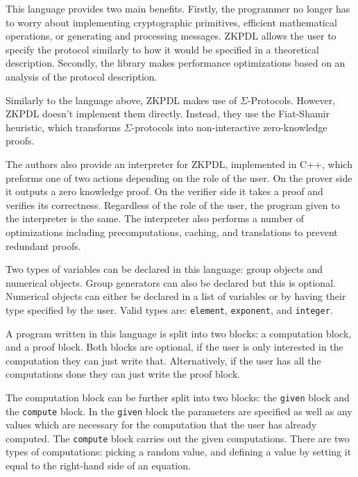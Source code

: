 \documentclass{sig-alternate}
\begin{document}
		This language provides two main benefits. Firstly, the programmer no longer 
		has to worry about implementing cryptographic primitives, efficient mathematical
		operations, or generating and processing messages. ZKPDL allows the user to
		specify the protocol similarly to how it would be specified in a theoretical
		description. Secondly, the library makes performance optimizations based on an
		analysis of the protocol description. 
		
		Similarly to the language above, ZKPDL makes use of $\Sigma$-Protocols.
		However, ZKPDL doesn't implement them directly. Instead, they use the 
		Fiat-Shamir heuristic, which transforms $\Sigma$-protocols into non-interactive
		zero-knowledge proofs.
		
		The authors also provide an interpreter for ZKPDL, implemented in C++, which
		preforms one of two actions depending on the role of the user. On the prover
		side it outputs a zero knowledge proof. On the verifier side it takes a proof
		and verifies its correctness. Regardless of the role of the user, the program
		given to the interpreter is the same. The interpreter also performs a number of
		optimizations including precomputations, caching, and translations to prevent
		redundant proofs. 

		Two types of variables can be declared in this language: group objects
		and numerical objects. Group generators can also be declared but this 
		is optional. Numerical objects can either be declared in a list of variables
		or by having their type specified by the user. Valid types are: \texttt{element},
		\texttt{exponent}, and \texttt{integer}. 		
		
		A program written in this language is split into two blocks: a computation block,
		and a proof block. Both blocks are optional, if the user is only interested in the
		computation they can just write that. Alternatively, if the user has all the computations
		done they can just write the proof block. 
		
		The computation block can be further split into two blocks: the \texttt{given} block
		and the \texttt{compute} block. In the \texttt{given} block the parameters are specified
		as well as any values which are necessary for the computation that the user has already
		computed. The \texttt{compute} block carries out the given computations. There are two
		types of computations: picking a random value, and defining a value by setting it
		equal to the right-hand side of an equation.
		
\end{document}
